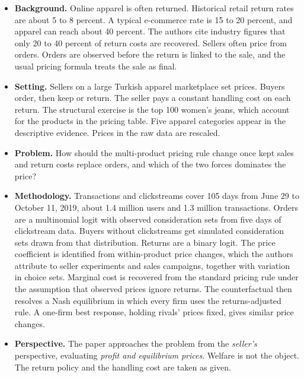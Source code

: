 \documentclass[11pt]{article}
\begin{document}
\begin{itemize}
    \item \textbf{Background.}
    Online apparel is often returned. Historical retail return rates are about 5 to 8 percent. A typical e-commerce rate is 15 to 20 percent, and apparel can reach about 40 percent. The authors cite industry figures that only 20 to 40 percent of return costs are recovered. Sellers often price from orders. Orders are observed before the return is linked to the sale, and the usual pricing formula treats the sale as final.

    \item \textbf{Setting.}
    Sellers on a large Turkish apparel marketplace set prices. Buyers order, then keep or return. The seller pays a constant handling cost on each return. The structural exercise is the top 100 women's jeans, which account for the products in the pricing table. Five apparel categories appear in the descriptive evidence. Prices in the raw data are rescaled.

    \item \textbf{Problem.}
    How should the multi-product pricing rule change once kept sales and return costs replace orders, and which of the two forces dominates the price?

    \item \textbf{Methodology.}
    Transactions and clickstreams cover 105 days from June 29 to October 11, 2019, about 1.4 million users and 1.3 million transactions. Orders are a multinomial logit with observed consideration sets from five days of clickstream data. Buyers without clickstreams get simulated consideration sets drawn from that distribution. Returns are a binary logit. The price coefficient is identified from within-product price changes, which the authors attribute to seller experiments and sales campaigns, together with variation in choice sets. Marginal cost is recovered from the standard pricing rule under the assumption that observed prices ignore returns. The counterfactual then resolves a Nash equilibrium in which every firm uses the returns-adjusted rule. A one-firm best response, holding rivals' prices fixed, gives similar price changes.

    \item \textbf{Perspective.}
    The paper approaches the problem from the \textit{seller's} perspective, evaluating \textit{profit and equilibrium prices}. Welfare is not the object. The return policy and the handling cost are taken as given.


\end{itemize}
\end{document}
